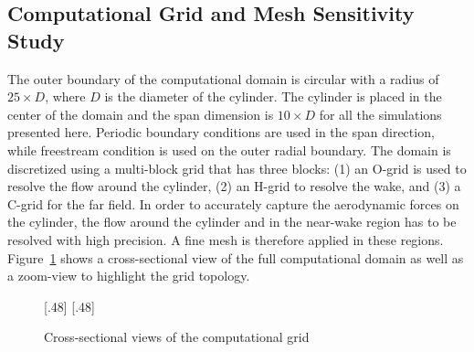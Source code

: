 \subsection{Computational Grid and Mesh Sensitivity Study}
\label{sec:grids}
%
The outer boundary of the computational domain is circular with a radius of
$25\times D$, where $D$ is the diameter of the cylinder. The cylinder is placed
in the center of the domain and the span dimension is $10\times D$ for all the
simulations presented here. Periodic boundary conditions are used in the span
direction, while freestream condition is used on the outer radial boundary. The
domain is discretized using a multi-block grid that has three blocks: (1) an
O-grid is used to resolve the flow around the cylinder, (2) an H-grid to
resolve the wake, and (3) a C-grid for the far field. In order to accurately
capture the aerodynamic forces on the cylinder, the flow around the cylinder
and in the near-wake region has to be resolved with high precision. A fine mesh
is therefore applied in these regions. Figure~\ref{fig:Mesh} shows a
cross-sectional view of the full computational domain as well as a zoom-view to
highlight the grid topology.
%
\begin{figure}[htb!]
  \centering
    [.48\linewidth]{}
  \hspace*{\fill}
    [.48\linewidth]{}
  \caption{Cross-sectional views of the computational grid}
  \label{fig:Mesh}
\end{figure}


